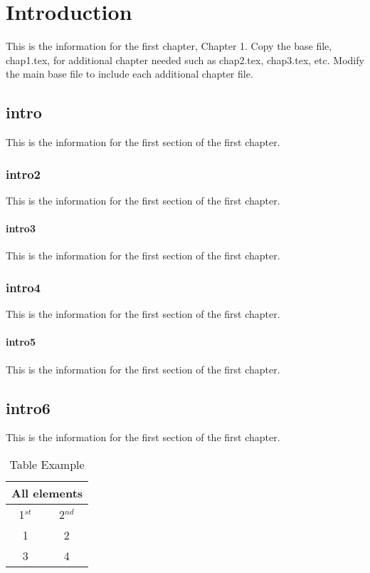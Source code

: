 %
%
\chapter{Introduction}
This is the information for the first chapter, Chapter 1.  Copy the base file, chap1.tex, for additional chapter needed such as chap2.tex, chap3.tex, etc. Modify the main base file to include each additional chapter file.

\section{intro}
This is the information for the first section of the first chapter.

\subsection{intro2}
This is the information for the first section of the first chapter.

\subsubsection{intro3}
This is the information for the first section of the first chapter.

\subsection{intro4}
This is the information for the first section of the first chapter.

\subsubsection*{intro5}
This is the information for the first section of the first chapter.

\section*{intro6}
This is the information for the first section of the first chapter.

\begin{table}
\begin{center}
\begin{tabular}{c|c}\hline
\multicolumn{2}{c}{All elements}\\
\hline
1$^{st}$ & 2$^{nd}$\\\hline
1 & 2\\
3 & 4\\\hline
\end{tabular}
\end{center}
\caption{Table Example}
\end{table}

